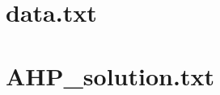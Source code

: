 \documentclass[10pt,fleqn,a4paper,twoside]{article}
\begin{document}
        
        
        
        \newpage
        \begin{appendices}
		\setcounter{section}{0}
		\makeatletter
	\section{data.txt}

	
	
	\section{AHP\_solution.txt}

	

	\end{appendices}
\end{document}
